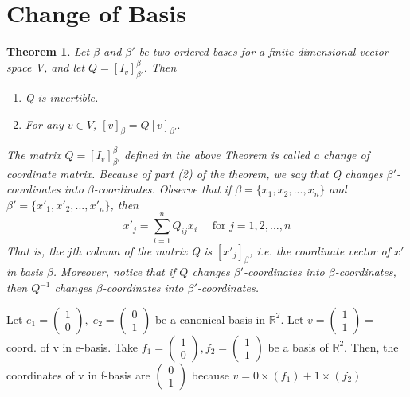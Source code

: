 \documentclass[12pt]{article}
\newtheorem{theorem}{Theorem}[section]
\theoremstyle{definition}
\theoremstyle{remark}
\begin{document}
\section{Change of Basis}
\begin{theorem}
    Let $\beta$ and $\beta'$ be two ordered bases for a finite-dimensional vector space V, and let $Q = [I_v]^{\beta}_{\beta'}$. Then
\begin{enumerate}
    \item Q is invertible. 
    \item For any $v \in V$, $[v]_\beta= Q[v]_{\beta'}.$
\end{enumerate}
The matrix $Q = [I_v]^{\beta}_{\beta'}$ defined in the above Theorem is called a change of coordinate matrix.
 Because of part (2) of the theorem, we say that Q changes $\beta'$-coordinates into $\beta$-coordinates. 
 Observe that if $\beta = \{x_1,x_2,...,x_n\}$ and $\beta' = \{x'_1,x'_2,...,x'_n\}$, then
 $$x'_j= \sum^n_{i=1} Q_{ij}x_i \quad \text{ for } j=1,2,...,n$$
 That is, the $j$th column of the matrix Q is $[x'_j]_\beta$, i.e. the coordinate vector of $x'$ in basis $\beta$. Moreover, notice that if $Q$ changes $\beta'$-coordinates 
 into $\beta$-coordinates, then $Q^{-1}$ changes $\beta$-coordinates into $\beta'$-coordinates.
\end{theorem}
\begin{example}
    Let $e_1 = \begin{pmatrix}
        1 \\ 0
    \end{pmatrix} , \; e_2 = \begin{pmatrix}
        0 \\ 1
    \end{pmatrix}$ 
    be a canonical basis in $\mathbb{R}^2$. Let $v = \begin{pmatrix}1 \\ 1 \end{pmatrix} = $ coord. of v in e-basis. 
    Take $f_1 = \begin{pmatrix}
        1 \\ 0
    \end{pmatrix},  f_2 = \begin{pmatrix}
        1 \\ 1
    \end{pmatrix}$ be a basis of $\mathbb{R}^2$. Then, the coordinates of v in f-basis are  $\begin{pmatrix}
        0 \\1
    \end{pmatrix}$ because $v = 0\times (f_1) + 1\times (f_2)$
\end{example}
\end{document}
